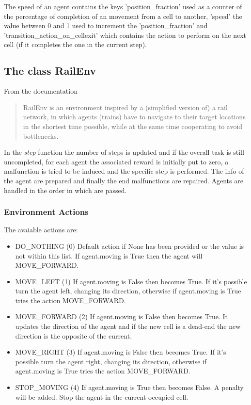\documentclass[12pt, a4paper, hidelinks]{article}
\begin{document}
The speed of an agent contains the keys 'position\_fraction' used as a counter of the percentage of completion of an movement from a cell to another, 'speed' the value between 0 and 1 used to increment the 'position\_fraction' and 'transition\_action\_on\_cellexit' which contains the action to perform on the next cell (if it completes the one in the current step).

\subsection{The class RailEnv}

From the documentation
\begin{quotation}
	RailEnv is an environment inspired by a (simplified version of) a rail
    network, in which agents (trains) have to navigate to their target
    locations in the shortest time possible, while at the same time cooperating
    to avoid bottlenecks.
\end{quotation}

In the \textit{step} function the number of steps is updated and if the overall task is still uncompleted, for each agent the associated reward is initially put to zero, a malfunction is tried to be induced and the specific step is performed.
The info of the agent are prepared and finally the end malfunctions are repaired.
Agents are handled in the order in which are passed.

\subsubsection*{Environment Actions}
The avaiable actions are:
\begin{itemize}
	\item DO\_NOTHING (0) Default action if None has been provided or the value is not within this list. If agent.moving is True then the agent will MOVE\_FORWARD\@.
    \item MOVE\_LEFT (1) If agent.moving is False then becomes True. If it's possible turn the agent left, changing its direction, otherwise if agent.moving is True tries the action MOVE\_FORWARD\@.
    \item MOVE\_FORWARD (2) If agent.moving is False then becomes True. It updates the direction of the agent and if the new cell is a dead-end the new direction is the opposite of the current.
    \item MOVE\_RIGHT (3) If agent.moving is False then becomes True. If it's possible turn the agent right, changing its direction, otherwise if agent.moving is True tries the action MOVE\_FORWARD\@.
    \item STOP\_MOVING (4) If agent.moving is True then becomes False. A penalty will be added. Stop the agent in the current occupied cell.
\end{itemize}
\end{document}
